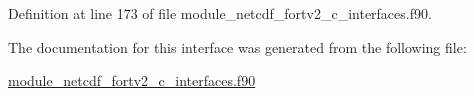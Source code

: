 Definition at line 173 of file module\+\_\+netcdf\+\_\+fortv2\+\_\+c\+\_\+interfaces.\+f90.



The documentation for this interface was generated from the following file\+:\begin{DoxyCompactItemize}
\item 
\hyperlink{module__netcdf__fortv2__c__interfaces_8f90}{module\+\_\+netcdf\+\_\+fortv2\+\_\+c\+\_\+interfaces.\+f90}\end{DoxyCompactItemize}
